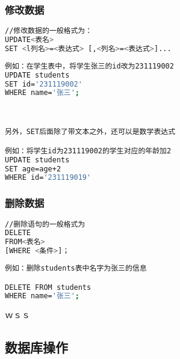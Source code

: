 \subsubsection{修改数据}
\begin{lstlisting}[language=bash]
//修改数据的一般格式为：
UPDATE<表名>
SET <l列名>=<表达式> [,<列名>=<表达式>]...
\end{lstlisting}

\begin{lstlisting}[language=bash]
例如：在学生表中，将学生张三的id改为231119002
UPDATE students 
SET id='231119002'
WHERE name='张三';



另外，SET后面除了带文本之外，还可以是数学表达式

例如：将学生id为231119002的学生对应的年龄加2
UPDATE students 
SET age=age+2
WHERE id='231119019'
\end{lstlisting}
\subsubsection{删除数据}

\begin{lstlisting}[language=bash]
//删除语句的一般格式为
DELETE
FROM<表名>
[WHERE <条件>]；
\end{lstlisting}

\begin{lstlisting}[language=bash]
例如：删除students表中名字为张三的信息

DELETE FROM students 
WHERE name='张三';
\end{lstlisting}

ｗｓｓ

\subsection{数据库操作}

